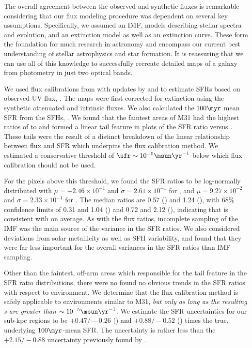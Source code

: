 The overall agreement between the observed and synthetic fluxes is remarkable
considering that our flux modeling procedure was dependent on several key
assumptions. Specifically, we assumed an IMF, models describing stellar spectra
and evolution, and an extinction model as well as an extinction curve. These
form the foundation for much research in astronomy and encompass our current
best understanding of stellar astrophysics and star formation. It is reassuring
that we can use all of this knowledge to successfully recreate detailed maps of
a galaxy from photometry in just two optical bands.

We used flux calibrations from \citet{Kennicutt:1998} with updates by
\citet{Hao:2011} and \citet{Murphy:2011} to estimate SFRs based on observed UV
flux, \sfrx{}. The \fxobs{} maps were first corrected for extinction using the
synthetic attenuated and intrinsic fluxes. We also calculated the $100\myr$
mean SFR from the SFHs, \sfroneh{}. We found that the faintest areas of M31 had
the highest ratios of \sfrx{} to \sfroneh{} and formed a linear tail feature in
plots of the SFR ratio versus \sfroneh{}. These tails were the result of a
distinct breakdown of the linear relationship between flux and SFR which
underpins the flux calibration method. We estimated a conservative threshold of
$\sfr \sim 10^{-5}\msun\yr^{-1}$ below which flux calibration should not be
used.

For the pixels above this threshold, we found the SFR ratios to be log-normally
distributed with $\mu = -2.46\times 10^{-1}$ and $\sigma = 2.61\times 10^{-1}$
for \fuv{}, and $\mu = 9.27\times 10^{-2}$ and $\sigma = 2.33\times 10^{-1}$
for \nuv{}. The median ratios are 0.57 (\fuv{}) and 1.24 (\nuv{}), with 68\%
confidence limits of 0.31 and 1.04 (\fuv{}) and 0.72 and 2.12 (\nuv{}),
indicating that \sfrx{} is consistent with \sfroneh{} on average. As with the
flux ratios, incomplete sampling of the IMF was the main source of the variance
in the SFR ratios. We also considered deviations from solar metallicity as well
as SFH variability, and found that they were far less important for the overall
variances in the SFR ratios than IMF sampling.

Other than the faintest, off-arm areas which responsible for the tail feature
in the SFR ratio distributions, there were no found no obvious trends in the
SFR ratios with respect to environment. We determine that the flux calibration
method is safely applicable to environments similar to M31, \emph{but only as
long as the resulting \sfr{}s are greater than $\sim 10^{-5}\msun\yr^{-1}$}. We
estimate the SFR uncertainties for our sub-kpc regions to be
$+\!0.47/\!-\!0.26$ (\fuv{}) and $+\!0.88/\!-\!0.52$ (\nuv{}) times the true,
underlying $100\myr$-mean SFR. The \sfrfuv{} uncertainty is rather less than
the $+\!2.15/\!-\!0.88$ uncertainty previously found by \citet{Simones:2014}.


